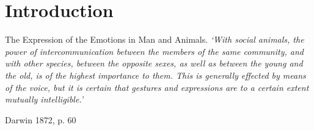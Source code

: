 \documentclass[xcolor=dvipsnames]{beamer}
\begin{document}
\section{Introduction}
\begin{frame}
\begin{block}{The Expression of the Emotions in Man and Animals.}
\textit {`With social animals, the power of intercommunication between the members of the same community, and with other species, between the opposite sexes, as well as between the young and the old, is of the highest importance to them. This is generally effected by means of the voice, but it is certain that gestures and expressions are to a certain extent mutually intelligible.'}
\begin{flushright} Darwin 1872, p. 60 \end{flushright}
\end{block} 
\end{frame}
\end{document}
